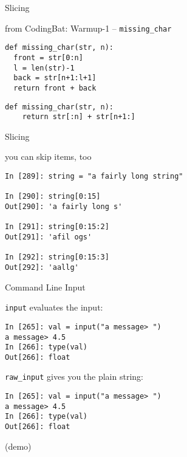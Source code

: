 \documentclass{beamer}
\begin{document}
\begin{frame}[fragile]{Slicing}

{\Large from CodingBat: Warmup-1 -- \verb+missing_char+ }

\begin{verbatim}
def missing_char(str, n):
  front = str[0:n]
  l = len(str)-1
  back = str[n+1:l+1]
  return front + back
\end{verbatim}

\begin{verbatim}
def missing_char(str, n):
    return str[:n] + str[n+1:]
\end{verbatim}

\end{frame} 

\begin{frame}[fragile]{Slicing}

{\Large you can skip items, too}

\begin{verbatim}
In [289]: string = "a fairly long string"

In [290]: string[0:15]
Out[290]: 'a fairly long s'

In [291]: string[0:15:2]
Out[291]: 'afil ogs'

In [292]: string[0:15:3]
Out[292]: 'aallg'
\end{verbatim}

\end{frame} 

\begin{frame}[fragile]{Command Line Input}

{\Large \verb|input| evaluates the input:}
\begin{verbatim}
In [265]: val = input("a message> ")
a message> 4.5
In [266]: type(val)
Out[266]: float
\end{verbatim}

{\Large \verb|raw_input| gives you the plain string:}
\begin{verbatim}
In [265]: val = input("a message> ")
a message> 4.5
In [266]: type(val)
Out[266]: float
\end{verbatim}

\vfill
(demo)
\end{frame}
\end{document}
